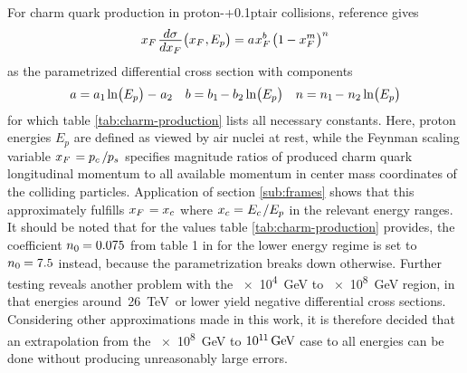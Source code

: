 For charm quark production in proton-{\kern+0.1pt}air collisions, reference \cite{Goncalves_2007} gives
\begin{equation*}
	x_F \kern+1.0pt \frac{\raisebox{-0.5ex}{$d\sigma$}}{\raisebox{0.5ex}{$dx_F$}} \bigl( x_F \kern+0.5pt, \kern-0.5pt E_p \bigr)
	\kern-0.1pt = a \kern+0.5pt x_F^b \kern+1.0pt \bigl( 1 \kern-0.3pt - x_F^m \kern+0.3pt \bigr)^n
\end{equation*}
as the parametrized differential cross section with components
\begin{align*}
	a = a_1 \kern-0.5pt \ln\bigl(E_p\bigr) - \kern+0.5pt a_2 && b = b_1 \kern-1.0pt - b_2 \ln\bigl(E_p\bigr) &&
	n = n_1 \kern-1.0pt - \kern+0.5pt n_2 \ln\bigl(E_p\bigr)
\end{align*}
for which table \ref{tab:charm-production} lists all necessary constants. Here, proton energies $E_p$ are defined as viewed
by air nuclei at rest, while the Feynman scaling variable $x_F \kern+1.0pt = p_c \kern+1.5pt / \kern-0.5pt p_s$ specifies
magnitude ratios of produced charm quark longitudinal momentum to all available momentum in center mass coordinates of the
colliding particles. Application of section \ref{sub:frames} shows that this approximately fulfills $x_F \kern+1.0pt = x_c$
where $\cramped{x_c = \kern+0.2pt E_c \kern+1.0pt / E_p}$ in the relevant energy ranges. It should be noted that for the values
table \ref{tab:charm-production} provides, the coefficient $n_0 \kern-0.5pt = \num{0.075}$ from table 1 in \cite{Goncalves_2007} 
for the lower energy regime is set to $n_0 \kern-0.5pt = \num{7.5}$ instead, because the parametrization breaks down otherwise.
Further testing reveals another problem with the \qty{e4}{\giga\electronvolt} to \qty{e8}{\giga\electronvolt} region,
in that energies around~\qty{26}{\tera\electronvolt}~or lower yield negative differential cross
sections. Considering other approximations made in this work, it is therefore decided that an extrapolation from the
\qty{e8}{\giga\electronvolt} to $10^{1 \kern-0.3pt 1} \kern+1.5pt \unit{\giga\electronvolt}$ case to all energies
can be done without producing unreasonably large errors.



